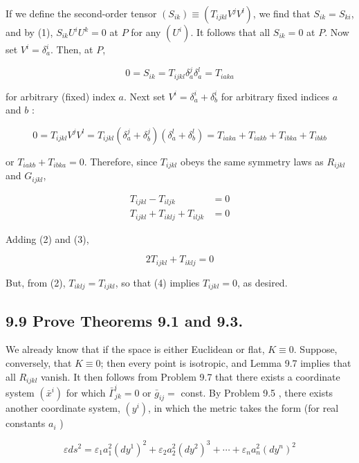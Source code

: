 \documentclass[10pt]{article}
\begin{document}
If we define the second-order tensor $\left(S_{i k}\right) \equiv\left(T_{i j k l} V^{j} V^{l}\right)$, we find that $S_{i k}=S_{k i}$, and by (1), $S_{i k} U^{i} U^{k}=0$ at $P$ for any $\left(U^{i}\right)$. It follows that all $S_{i k}=0$ at $P$. Now set $V^{i}=\delta_{a}^{i}$. Then, at $P$,

$$
0=S_{i k}=T_{i j k l} \delta_{a}^{j} \delta_{a}^{l}=T_{i a k a}
$$

for arbitrary (fixed) index $a$. Next set $V^{i}=\delta_{a}^{i}+\delta_{b}^{i}$ for arbitrary fixed indices $a$ and $b$ :

$$
0=T_{i j k l} V^{j} V^{l}=T_{i j k l}\left(\delta_{a}^{j}+\delta_{b}^{j}\right)\left(\delta_{a}^{l}+\delta_{b}^{l}\right)=T_{i a k a}+T_{i a k b}+T_{i b k a}+T_{i b k b}
$$

or $T_{i a k b}+T_{i b k a}=0$. Therefore, since $T_{i j k l}$ obeys the same symmetry laws as $R_{i j k l}$ and $G_{i j k l}$,


\begin{align*}
T_{i j k l}-T_{i l j k} & =0  \tag{2}\\
T_{i j k l}+T_{i k l j}+T_{i l j k} & =0 \tag{3}
\end{align*}


Adding (2) and (3),


\begin{equation*}
2 T_{i j k l}+T_{i k l j}=0 \tag{4}
\end{equation*}


But, from (2), $T_{i k l j}=T_{i j k l}$, so that (4) implies $T_{i j k l}=0$, as desired.

\subsection*{9.9 Prove Theorems 9.1 and 9.3.}
We already know that if the space is either Euclidean or flat, $K \equiv 0$. Suppose, conversely, that $K \equiv 0$; then every point is isotropic, and Lemma 9.7 implies that all $R_{i j k l}$ vanish. It then follows from Problem 9.7 that there exists a coordinate system $\left(\bar{x}^{i}\right)$ for which $\bar{\Gamma}_{j k}^{i}=0$ or $\bar{g}_{i j}=$ const. By Problem 9.5 , there exists another coordinate system, $\left(y^{i}\right)$, in which the metric takes the form (for real constants $a_{i}$ )

$$
\varepsilon d s^{2}=\varepsilon_{1} a_{1}^{2}\left(d y^{1}\right)^{2}+\varepsilon_{2} a_{2}^{2}\left(d y^{2}\right)^{3}+\cdots+\varepsilon_{n} a_{n}^{2}\left(d y^{n}\right)^{2}
$$
\end{document}
